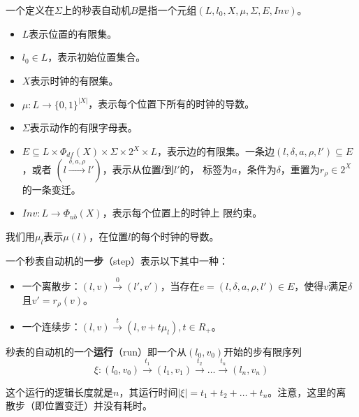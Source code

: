 \begin{definition}
	\label{def:SWA}
	一个定义在$\varSigma$上的秒表自动机$B$是指一个元组$(L,l_0,X,\mu,\varSigma,
	E,Inv)$。
	\begin{itemize}
		\item $L$表示位置的有限集。
		\item $l_0\in L$，表示初始位置集合。
		\item $X$表示时钟的有限集。
		\item $\mu:L\longrightarrow \{0,1\}^{|X|}$，表示每个位置下所有的时钟的导数。
		\item $\varSigma$表示动作的有限字母表。
		\item $E\subseteq L\times \varPhi_{df}(X)\times \varSigma \times 2^X
		\times L$，表示边的有限集。一条边$(l,\delta,a,\rho,l')\subseteq E$，或者
		$(l\stackrel{\delta,a,\rho}{\longrightarrow}l')$，表示从位置$l$到$l'$的，
		标签为$a$，条件为$\delta$，重置为$r_\rho \in 2^X$的一条变迁。
		\item $Inv:L\longrightarrow \varPhi_{ub}(X)$，表示每个位置上的时钟上
		限约束。
	\end{itemize}
\end{definition}

我们用$\mu_l$表示$\mu(l)$，在位置$l$的每个时钟的导数。

\begin{definition}
	\label{def:step}
	一个秒表自动机的\textbf{一步}（step）表示以下其中一种：
	\begin{itemize}
		\item 一个离散步：$(l,v)\stackrel{0}{\longrightarrow}(l',v')$，当存在$e=(l,
		\delta,a,\rho,l')\in E$，使得$v$满足$\delta$且$v'=r_\rho(v)$。
		\item 一个连续步：$(l,v)\stackrel{t}{\longrightarrow}(l,v+t\mu_l), t\in R_+$。
	\end{itemize}
\end{definition}

\begin{definition}
	\label{def:run}
	秒表的自动机的一个\textbf{运行}（run）即一个从$(l_0,v_0)$开始的步有限序列
	\begin{equation}
		\xi: (l_0,v_0)\stackrel{t_1}{\longrightarrow}(l_1,v_1)\stackrel{t_2}
		{\longrightarrow}\dots\stackrel{t_n}{\longrightarrow}(l_n,v_n)
	\end{equation}
\end{definition}

这个运行的逻辑长度就是$n$，其运行时间$|\xi|=t_1+t_2+\dots+t_n$。注意，这里的离
散步（即位置变迁）并没有耗时。

